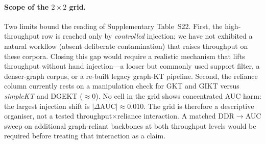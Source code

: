 \documentclass[preprint,10pt,doubleblind]{elsarticle}
\newcommand{\DDR}{\textsc{DDR}}
\begin{document}
\paragraph{Scope of the $2{\times}2$ grid.}
Two limits bound the reading of Supplementary Table~S22.
First, the high-throughput row is reached only by \emph{controlled} injection;
we have not exhibited a natural workflow (absent deliberate contamination) that
raises throughput on these corpora. Closing this gap would require a realistic
mechanism that lifts throughput without hand injection---a looser but commonly
used support filter, a denser-graph corpus, or a re-built legacy graph-KT
pipeline. Second, the reliance column currently rests on a manipulation check
for GKT and GIKT versus \textit{simpleKT} and DGEKT (${\approx}0$). No cell
in the grid shows concentrated AUC harm: the largest injection shift is
$|\Delta\text{AUC}|{\approx}0.010$. The grid is therefore a descriptive
organiser, not a tested throughput$\times$reliance interaction. A matched
\DDR{}$\to$AUC sweep on additional graph-reliant backbones at both throughput
levels would be required before treating that interaction as a claim.
\end{document}
